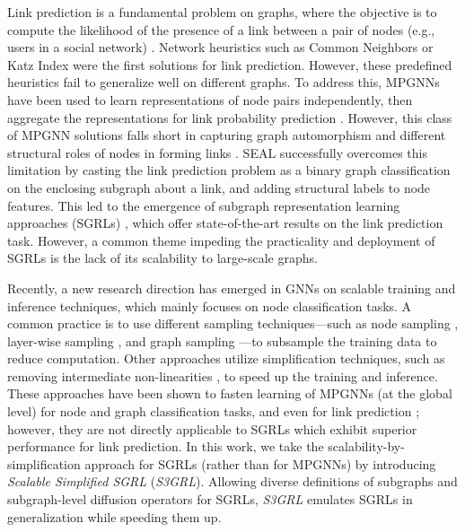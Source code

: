 \documentclass[sigconf, nonacm]{acmart}
\newcommand{\ssgrl}{\textit{S3GRL}\xspace}
\begin{document}
Link prediction is a fundamental problem on graphs, where the objective is to compute the likelihood of the presence of a link between a pair of nodes (e.g., users in a social network) \cite{liben2003link}. Network heuristics such as Common Neighbors or Katz Index \cite{katz1953new} were the first solutions for link prediction. However, these predefined heuristics fail to generalize well on different graphs. To address this, MPGNNs have been used to learn representations of node pairs independently, then aggregate the representations for link probability prediction \cite{kipf2016variational,Mavromatis2021GraphIM}. However, this class of MPGNN solutions falls short in capturing graph automorphism and different structural roles of nodes in forming links \cite{zhang2021labeling}. SEAL \cite{zhang2018link} successfully overcomes this limitation by casting the link prediction problem as a binary graph classification on the enclosing subgraph about a link, and adding structural labels to node features. This led to the emergence of subgraph representation learning approaches (SGRLs) \cite{zhang2018link,li2020distance}, which offer state-of-the-art results on the link prediction task. However, a common theme impeding the practicality and deployment of SGRLs is the lack of its scalability to large-scale graphs. 


Recently, a new research direction has emerged in GNNs on scalable training and inference techniques, which mainly focuses on node classification tasks. A common practice is to use different sampling techniques---such as node sampling \cite{hamilton2017inductive}, layer-wise sampling \cite{zou2019layer}, and graph sampling \cite{graphsaint-iclr20}---to subsample the training data to reduce computation. Other approaches utilize simplification techniques, such as removing intermediate non-linearities \cite{wu2019simplifying,sign_icml_grl2020}, to speed up the training and inference. These approaches have been shown to fasten learning of MPGNNs (at the global level) for node and graph classification tasks, and even for link prediction \cite{10.1145/3546157.3546163}; however, they are not directly applicable to SGRLs which exhibit superior performance for link prediction.  
In this work, we take the scalability-by-simplification approach for SGRLs (rather than for MPGNNs) by introducing \textit{Scalable Simplified  SGRL} (\ssgrl). Allowing diverse definitions of subgraphs and subgraph-level diffusion operators for SGRLs, \ssgrl emulates SGRLs in generalization while speeding them up.
\end{document}
